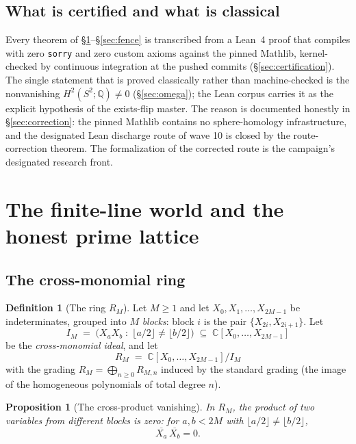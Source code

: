 \documentclass[11pt,a4paper]{article}
\theoremstyle{plain}
\newtheorem{proposition}[theorem]{Proposition}
\theoremstyle{definition}
\newtheorem{definition}[theorem]{Definition}
\newcommand{\Q}{\mathbb{Q}}
\newcommand{\C}{\mathbb{C}}
\begin{document}
\subsection{What is certified and what is classical}

Every theorem of \S\ref{sec:world}--\S\ref{sec:fence} is transcribed
from a Lean~4 proof that compiles with zero \texttt{sorry} and zero
custom axioms against the pinned Mathlib, kernel-checked by continuous
integration at the pushed commits (\S\ref{sec:certification}).  The single
statement that is proved classically rather than machine-checked is the
nonvanishing $H^2(S^2;\Q) \ne 0$ (\S\ref{sec:omega}); the Lean corpus
carries it as the explicit hypothesis of the exists-flip master.  The
reason is documented honestly in \S\ref{sec:correction}: the pinned
Mathlib contains no sphere-homology infrastructure, and the designated
Lean discharge route of wave 10 is closed by the route-correction
theorem.  The formalization of the corrected route is the campaign's
designated research front.

\section{The finite-line world and the honest prime lattice}\label{sec:world}

\subsection{The cross-monomial ring}

\begin{definition}[The ring $R_M$]\label{def:ring}
Let $M \ge 1$ and let $X_0, X_1, \dots, X_{2M-1}$ be indeterminates,
grouped into $M$ \emph{blocks}: block $i$ is the pair
$\{X_{2i}, X_{2i+1}\}$.  Let
\[
I_M \;=\; \bigl( X_a X_b \;:\; \lfloor a/2 \rfloor \ne \lfloor b/2
\rfloor \bigr) \;\subseteq\; \C[X_0, \dots, X_{2M-1}]
\]
be the \emph{cross-monomial ideal}, and let
\[
R_M \;=\; \C[X_0,\dots,X_{2M-1}]/I_M
\]
with the grading $R_M = \bigoplus_{n \ge 0} R_{M,n}$ induced by the
standard grading (the image of the homogeneous polynomials of total
degree $n$).
\end{definition}

\begin{proposition}[The cross-product vanishing]\label{prop:cross}
In $R_M$, the product of two variables from different blocks is zero:
for $a, b < 2M$ with $\lfloor a/2\rfloor \ne \lfloor b/2 \rfloor$,
\[
\overline{X_a}\,\overline{X_b} = 0 .
\]
\end{proposition}
\end{document}
